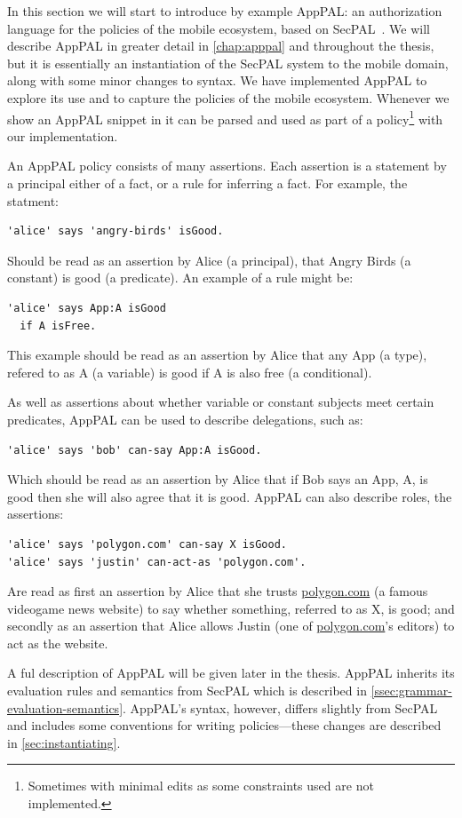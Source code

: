 \documentclass[thesis.tex]{subfiles}
\begin{document}
In this section we will start to introduce by example AppPAL: an authorization
language for the policies of the mobile ecosystem, based on
SecPAL~\cite{becker_secpal:_2006}. We will describe AppPAL in greater detail in
\autoref{chap:apppal} and throughout the thesis, but it is essentially an
instantiation of the SecPAL system to the mobile domain, along with some minor
changes to syntax. We have implemented AppPAL to explore its use and to capture
the policies of the mobile ecosystem. Whenever we show an AppPAL snippet in
 it can be parsed and used as part of a
policy\footnote{Sometimes with minimal edits as some constraints used are not
implemented.} with our implementation.

An AppPAL policy consists of many assertions.  Each assertion is a statement by
a principal either of a fact, or a rule for inferring a fact.  For example, the statment:
\begin{lstlisting}
'alice' says 'angry-birds' isGood.
\end{lstlisting}
Should be read as an assertion by Alice (a principal), that Angry Birds (a
constant) is good (a predicate).  An example of a rule might be:
\begin{lstlisting}
'alice' says App:A isGood 
  if A isFree.
\end{lstlisting}
This example should be read as an assertion by Alice that any App (a type),
refered to as A (a variable) is good if A is also free (a conditional).   

As well as assertions about whether variable or constant subjects meet certain
predicates, AppPAL can be used to describe delegations, such as:
\begin{lstlisting}
'alice' says 'bob' can-say App:A isGood.
\end{lstlisting}
Which should be read as an assertion by Alice that if Bob says an App, A, is
good then she will also agree that it is good.  AppPAL can also describe roles,
the assertions:
\begin{lstlisting}
'alice' says 'polygon.com' can-say X isGood.
'alice' says 'justin' can-act-as 'polygon.com'.
\end{lstlisting}
Are read as first an assertion by Alice that she trusts \url{polygon.com} (a
famous videogame news website) to say whether something, referred to as X, is
good; and secondly as an assertion that Alice allows Justin (one of
\url{polygon.com}'s editors) to act as the website.  

A ful description of AppPAL will be given later in the thesis.  
AppPAL inherits its evaluation rules and semantics from SecPAL which is described in
\autoref{ssec:grammar-evaluation-semantics}.  AppPAL's syntax, however, differs slightly
from SecPAL and includes some conventions for writing policies---these changes
are described in \autoref{sec:instantiating}.
\end{document}
